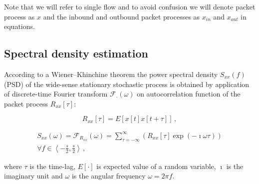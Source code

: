 Note that we will refer to single flow and to avoid confusion
we will denote packet process as $x$ and the inbound and
outbound packet processes as $x_{in}$ and $x_{out}$  in equations. 


\subsection{Spectral density estimation}\label{sec:psd}

According to a Wiener–Khinchine %
theorem the power spectral density $S_{xx}(f)$ (PSD) of the wide-sense stationary 
stochastic process is obtained by application of discrete-time 
Fourier transform $\mathcal{F}_{\cdot}(\omega)$ on autocorrelation function 
of the packet process $R_{xx}\left[\tau\right]$:

\begin{equation}\label{eq:corr}
R_{xx}\left[\tau\right] = E[x\left[t\right]x\left[t+\tau\right]]\, , 
\end{equation}

\begin{equation}\label{eq:psd}
\begin{split}
S_{xx}(\omega) = \mathcal{F}_{R_{xx}}\left(\omega\right) = \sum_{\tau=-\infty}^{\infty} 
\left( R_{xx}\left[\tau\right] \exp\left( -\imath \omega\tau \right)\right) \\ 
\forall f \in \left\langle -\frac{s}{2},\frac{s}{2} \right\rangle\, , 
\end{split}
\end{equation}

where $\tau$ is the time-lag, $E\left[\cdot\right]$ is expected value of a random variable, $\imath$
is the imaginary unit and $\omega$ is the angular frequency $\omega= 2\pi f$. 

